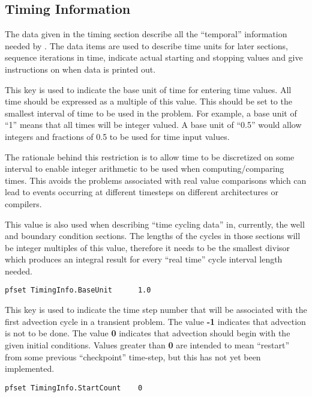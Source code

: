 \subsection{Timing Information}
\label{Timing Information}

The data given in the timing section describe all the ``temporal''
information needed by \parflow{}.  The data items are used to
describe time units for later sections, sequence iterations in time,
indicate actual starting and stopping values and give instructions
on when data is printed out.

 { This key is used to
  indicate the base unit of time for entering time values.  All time
  should be expressed as a multiple of this value.  This should be set
  to the smallest interval of time to be used in the problem.  For
  example, a base unit of ``1'' means that all times will be integer
  valued.  A base unit of ``0.5'' would allow integers and fractions
  of 0.5 to be used for time input values.

  The rationale behind this restriction is to allow time to be
  discretized on some interval to enable integer arithmetic to be used
  when computing/comparing times.  This avoids the problems associated
  with real value comparisons which can lead to events occurring at
  different timesteps on different architectures or compilers.

  This value is also used when describing ``time cycling data'' in,
  currently, the well and boundary condition sections.  The lengths of
  the cycles in those sections will be integer multiples of this
  value, therefore it needs to be the smallest divisor which produces
  an integral result for every ``real time'' cycle interval length
  needed.  
}
\begin{display}\begin{verbatim}
pfset TimingInfo.BaseUnit      1.0
\end{verbatim}\end{display}

{
This key is used to indicate the time step number that will be associated
with the first advection cycle in a transient problem.  The value
{\bf -1} indicates that advection is not to be done.  The value {\bf 0}
indicates that advection should begin with the given initial conditions.
Values greater than {\bf 0} are intended to mean ``restart'' from some
previous ``checkpoint'' time-step, but this has not yet been implemented.
}
\begin{display}\begin{verbatim}
pfset TimingInfo.StartCount    0
\end{verbatim}\end{display}

